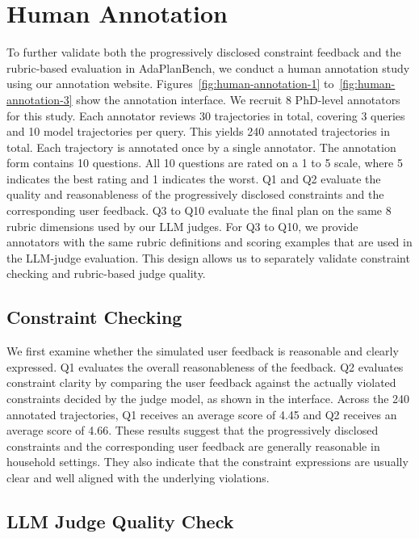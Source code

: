 \documentclass{llmxive}
\providecommand{\bench}[1]{AdaPlanBench}
\begin{document}
\section{Human Annotation}
\label{app:human-annotation}

To further validate both the progressively disclosed constraint feedback and the rubric-based evaluation in \bench{}, we conduct a human annotation study using our annotation website.
Figures~\ref{fig:human-annotation-1} to~\ref{fig:human-annotation-3} show the annotation interface.
We recruit 8 PhD-level annotators for this study.
Each annotator reviews 30 trajectories in total, covering 3 queries and 10 model trajectories per query.
This yields 240 annotated trajectories in total.
Each trajectory is annotated once by a single annotator.
The annotation form contains 10 questions.
All 10 questions are rated on a 1 to 5 scale, where 5 indicates the best rating and 1 indicates the worst.
Q1 and Q2 evaluate the quality and reasonableness of the progressively disclosed constraints and the corresponding user feedback.
Q3 to Q10 evaluate the final plan on the same 8 rubric dimensions used by our LLM judges.
For Q3 to Q10, we provide annotators with the same rubric definitions and scoring examples that are used in the LLM-judge evaluation.
This design allows us to separately validate constraint checking and rubric-based judge quality.

\subsection{Constraint Checking}
\label{app:human-annotation-constraint-checking}

We first examine whether the simulated user feedback is reasonable and clearly expressed.
Q1 evaluates the overall reasonableness of the feedback.
Q2 evaluates constraint clarity by comparing the user feedback against the actually violated constraints decided by the judge model, as shown in the interface.
Across the 240 annotated trajectories, Q1 receives an average score of 4.45 and Q2 receives an average score of 4.66.
These results suggest that the progressively disclosed constraints and the corresponding user feedback are generally reasonable in household settings.
They also indicate that the constraint expressions are usually clear and well aligned with the underlying violations.

\subsection{LLM Judge Quality Check}
\label{app:human-annotation-llm-judge-check}
\end{document}
